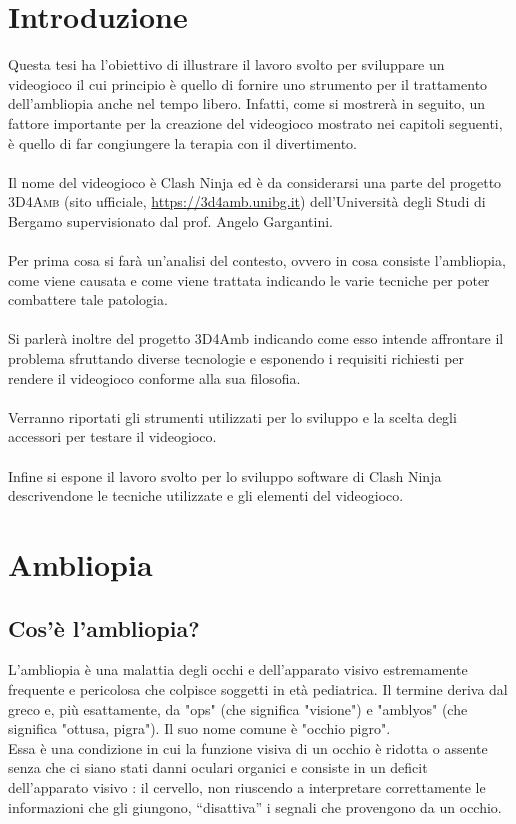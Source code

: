 \documentclass[12pt,a4paper,openright,twoside]{book}
\begin{document}
    
    \tableofcontents %
    \newpage
    \thispagestyle{empty}
    \chapter*{Introduzione}
    Questa tesi ha l'obiettivo di illustrare il lavoro svolto per sviluppare un videogioco il cui principio è quello di 
    fornire uno strumento per il trattamento dell'ambliopia anche nel tempo libero. Infatti, come si mostrerà in seguito, un fattore 
    importante per la creazione del videogioco mostrato nei capitoli seguenti, è quello di far congiungere la terapia
    con il divertimento.  \\\\
    Il nome del videogioco è Clash Ninja ed è da considerarsi una parte del progetto \textsc{3D4Amb} (sito ufficiale, \url{https://3d4amb.unibg.it}) dell'Università degli Studi di Bergamo supervisionato dal prof. Angelo Gargantini. \\\\
    Per prima cosa si farà un'analisi del contesto, ovvero in cosa consiste l'ambliopia, come viene causata e come viene
    trattata indicando le varie tecniche per poter combattere tale patologia.\\\\
    Si parlerà inoltre del progetto 3D4Amb indicando come esso intende affrontare il problema sfruttando diverse tecnologie e 
    esponendo i requisiti richiesti per rendere il videogioco conforme alla sua filosofia.\\\\
    Verranno riportati gli strumenti utilizzati per lo sviluppo e la scelta degli accessori per testare il videogioco. \\\\
    Infine si espone il lavoro svolto per lo sviluppo software di Clash Ninja descrivendone le tecniche utilizzate e gli elementi
    del videogioco.
    
    \newpage  
    \thispagestyle{empty}
    
    
    \chapter{Ambliopia}
    \section{Cos'è l'ambliopia?}
    L'ambliopia è una malattia degli occhi e dell'apparato visivo estremamente frequente e pericolosa che colpisce soggetti in età pediatrica.
    Il termine deriva dal greco e, più esattamente, da "ops" (che significa "visione") e "amblyos" (che significa "ottusa, pigra"). Il suo nome comune è "occhio pigro". \cite{wiki:xxx} \\ Essa è una condizione in cui la funzione visiva di un occhio è ridotta o assente senza che ci siano stati danni oculari organici e consiste in un deficit dell’apparato visivo : il cervello, non riuscendo a interpretare correttamente le informazioni che gli giungono, “disattiva” i segnali che provengono da un occhio. \cite{iapbamb} \\
    
\end{document}
